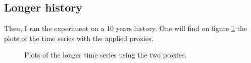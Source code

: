 \documentclass[11pt,a4paper,oneside]{book}
\begin{document}
\clearpage
\subsection{Longer history}

Then, I ran the experiment on a 10 years history. One will find on figure \ref{fig:plot10y} the plots of the time series with the applied proxies.


\begin{figure}[!h]
\centering
{}
\caption{Plots of the longer time series using the two proxies.}
\label{fig:plot10y}
\end{figure}
\end{document}
